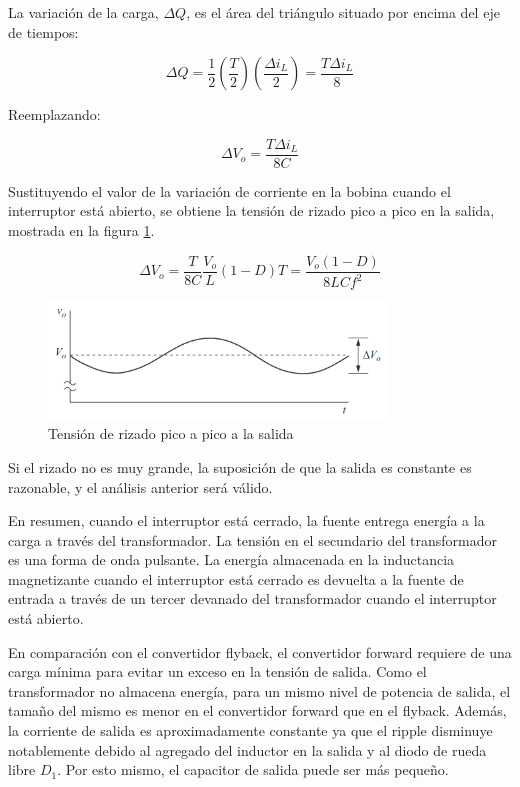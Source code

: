La variación de la carga, $\Delta Q$, es el área del triángulo situado por encima del eje de tiempos:

$$ \Delta Q=\frac{1}{2}\left(\frac{T}{2}\right)\left(\frac{\Delta i_L}{2}\right)=\frac{T\Delta i_L}{8} $$

Reemplazando:

$$ \Delta V_o=\frac{T\Delta i_L}{8C} $$

Sustituyendo el valor de la variación de corriente en la bobina cuando el interruptor está abierto, 
se obtiene la tensión de rizado pico a pico en la salida, mostrada en la figura \ref{fig:buck_converter_capacitor_ripple_voltage}.

$$ \Delta V_o=\frac{T}{8C}\frac{V_o}{L}(1-D)T=\frac{V_o(1-D)}{8LCf^2} $$

\begin{figure}[ht]
    \centering
    \includegraphics[width=0.8\textwidth]{../images/hart/buck_converter_capacitor_ripple_voltage.png}
    \caption{Tensión de rizado pico a pico a la salida}
    \label{fig:buck_converter_capacitor_ripple_voltage}
\end{figure}

Si el rizado no es muy grande, la suposición de que la salida es constante es razonable, y el
análisis anterior será válido.


En resumen, cuando el interruptor está cerrado, la fuente entrega energía a la carga a través del transformador.
La tensión en el secundario del transformador es una forma de onda pulsante. La energía almacenada en
la inductancia magnetizante cuando el interruptor está cerrado es devuelta a la fuente de
entrada a través de un tercer devanado del transformador cuando el interruptor está abierto.

En comparación con el convertidor flyback, el convertidor forward requiere de una carga mínima para evitar un exceso en la tensión de salida. 
Como el transformador no almacena energía, para un mismo nivel de potencia de salida, 
el tamaño del mismo es menor en el convertidor forward que en el flyback. 
Además, la corriente de salida es aproximadamente constante ya que el ripple disminuye notablemente 
debido al agregado del inductor en la salida y al diodo de rueda libre $D_1$.
Por esto mismo, el capacitor de salida puede ser más pequeño. 

